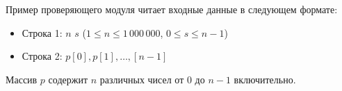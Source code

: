 Пример проверяющего модуля читает входные данные в следующем формате:
\begin{itemize}
\item Строка 1: $n$ $s$ ($1 \le n \le 1\,000\,000$, $0 \le s \le n-1$)
\item Строка 2: $p[0], p[1], \ldots, [n - 1]$
\end{itemize}


Массив $p$ содержит $n$ различных чисел от $0$ до $n-1$ включительно.